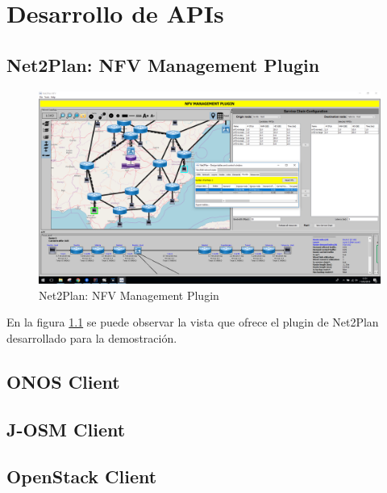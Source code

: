 \chapter{Desarrollo de APIs}

\section{Net2Plan: NFV Management Plugin}
\label{sec:nfvplugin}
\begin{figure}[!ht]
	\centering
	\includegraphics[width=0.9\linewidth]{imagenes/n2p_extension}
	\caption{Net2Plan: NFV Management Plugin}
	\label{fig:n2pextension}
\end{figure}

En la figura \ref{fig:n2pextension} se puede observar la vista que ofrece el plugin de Net2Plan desarrollado para la demostración.

\section{ONOS Client}
\label{sec:onosclient}

\section{J-OSM Client}
\label{sec:osmclient}

\section{OpenStack Client}
\label{sec:openstackclient}

\cleardoublepage
